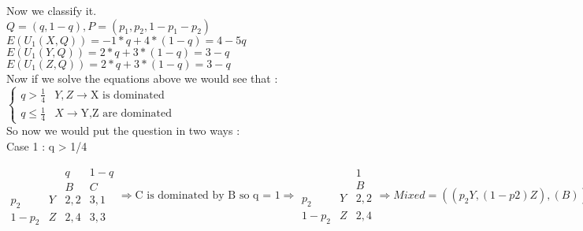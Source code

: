 \begin{enumerate}
\begin{latin}
    Now we classify it.\\
    $Q = (q,1-q) , P = (p_1,p_2,1-p_1-p_2)$\\
    $E(U_1(X,Q)) = -1 * q + 4 * (1-q) = 4 - 5q$\\
    $E(U_1(Y,Q)) = 2 * q + 3 * (1-q) = 3 - q$\\
    $E(U_1(Z,Q)) = 2 * q + 3 * (1-q) = 3 - q$\\
    Now if we solve the equations above we would see that : \\
    $ \begin{cases}
        q > \frac{1}{4} & Y,Z \rightarrow \text{X is dominated}\\
        q \leq \frac{1}{4} & X \rightarrow \text{Y,Z are dominated}
    \end{cases} $
    \\
    So now we would put the question in two ways : \\
    Case 1 : q > 1/4 \\
    \begin{center}
        \begin{equation*}
                    \begin{matrix}
                          &  & q & 1-q \\
                          &  & B & C \\
                         p_2 & Y & 2,2 & 3,1\\
                         1-p_2 & Z & 2,4 & 3,3
                        \end{matrix} \Longrightarrow \text{C is dominated by B so q = 1} \Longrightarrow
                        \begin{matrix}
                            &  & 1\\
                            &  & B\\
                           p_2 & Y & 2,2 \\
                           1-p_2 & Z & 2,4
                          \end{matrix} \Rightarrow Mixed = ((p_2Y,(1-p2)Z),(B))
                    \end{equation*}
                   

\end{center}
\end{latin}
\end{enumerate}
